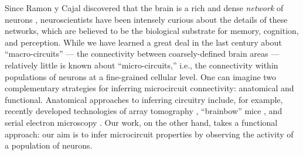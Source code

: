 Since Ramon y Cajal discovered that the brain is a rich and dense \emph{network} of neurons \cite{RamonyCajal04,RamonyCajal23}, neuroscientists have been intensely curious about the details of these networks, which are believed to be the biological substrate for memory, cognition, and perception. While we have learned a great deal in the last century about ``macro-circuits'' --- the connectivity between coarsely-defined brain areas --- relatively little is known about ``micro-circuits,'' i.e., the connectivity within populations of neurons at a fine-grained cellular level. One can imagine two complementary strategies for inferring microcircuit connectivity: anatomical and functional. Anatomical approaches to inferring circuitry include, for example, recently developed technologies of array tomography \cite{MichevaSmith07}, ``brainbow'' mice \cite{Brainbow07}, and serial electron microscopy \cite{Briggman2006}. Our work, on the other hand, takes a functional approach: our aim is to infer microcircuit properties by observing the activity of a population of neurons.

